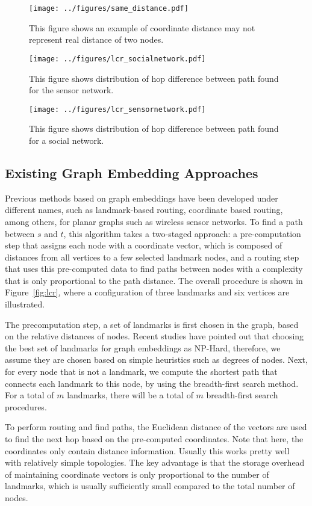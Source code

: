 \begin{figure*}[t]
  \texttt{[image: ../figures/same\_distance.pdf]}
  \caption{This figure shows an example of coordinate distance may not represent real distance of two nodes.}\label{fig:same_distance}
\endminipage\hfill
{}
  \texttt{[image: ../figures/lcr\_socialnetwork.pdf]}
  \caption{This figure shows distribution of hop difference between path found for the sensor network.}\label{fig:lcr_socialnetwork}
\endminipage\hfill
{}
  \texttt{[image: ../figures/lcr\_sensornetwork.pdf]}
  \caption{This figure shows distribution of hop difference between path found for a social network.}\label{fig:lcr_sensornetwork}
\endminipage
\vspace{-0.1in}
\end{figure*}

\subsection{Existing Graph Embedding Approaches}

Previous methods based on graph embeddings have been developed under different names, such as landmark-based routing, coordinate based routing, among others, for planar graphs such as wireless sensor networks. To find a path between $s$ and $t$, this algorithm takes a two-staged approach: a pre-computation step that assigns each node with a coordinate vector, which is composed of distances from all vertices to a few selected landmark nodes, and a routing step that uses this pre-computed data to find paths between nodes with a complexity that is only proportional to the path distance. The overall procedure is shown in Figure~\ref{fig:lcr}, where a configuration of three landmarks and six vertices are illustrated.

The precomputation step, a set of landmarks is first chosen in the graph, based on the relative distances of nodes. Recent studies have pointed out that choosing the best set of landmarks for graph embeddings as NP-Hard, therefore, we assume they are chosen based on simple heuristics such as degrees of nodes. Next, for every node that is not a landmark, we compute the shortest path that connects each landmark to this node, by using the breadth-first search method. For a total of $m$ landmarks, there will be a total of $m$ breadth-first search procedures.

To perform routing and find paths, the Euclidean distance of the vectors are used to find the next hop based on the pre-computed coordinates. Note that here, the coordinates only contain distance information. Usually this works pretty well with relatively simple topologies. The key advantage is that the storage overhead of maintaining coordinate vectors is only proportional to the number of landmarks, which is usually sufficiently small compared to the total number of nodes.

